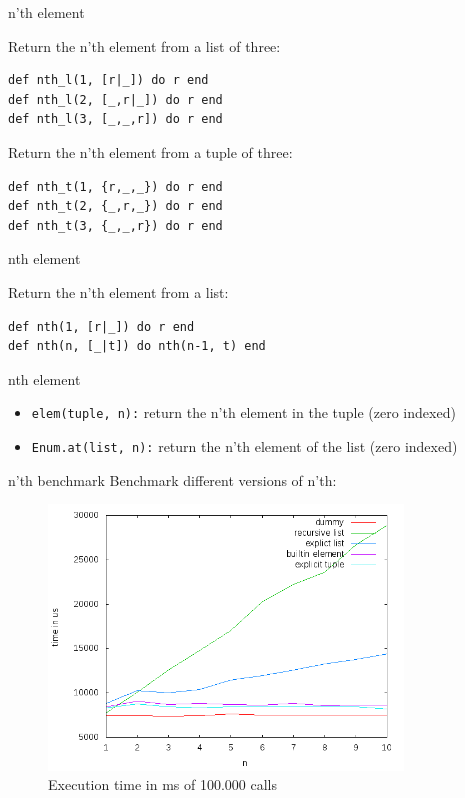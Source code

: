 \begin{frame}[fragile]{n'th element}

Return the n'th element from a list of three:

\pause 
\begin{verbatim}
def nth_l(1, [r|_]) do r end
def nth_l(2, [_,r|_]) do r end
def nth_l(3, [_,_,r]) do r end
\end{verbatim}

\pause Return the n'th element from a tuple of three:
\pause

\begin{verbatim}
def nth_t(1, {r,_,_}) do r end
def nth_t(2, {_,r,_}) do r end
def nth_t(3, {_,_,r}) do r end
\end{verbatim}

\end{frame}

\begin{frame}[fragile]{nth element}

Return the n'th element from a list:

\pause 
\begin{verbatim}
def nth(1, [r|_]) do r end
def nth(n, [_|t]) do nth(n-1, t) end
\end{verbatim}

\end{frame}


\begin{frame}{nth element}

\begin{itemize}
  \item {\tt elem(tuple, n):} return the n'th element in the tuple (zero indexed)
  \item {\tt Enum.at(list, n):} return the n'th element of the list (zero indexed)
\end{itemize}

\end{frame}

\begin{frame}{n'th benchmark}
Benchmark different versions of n'th:
 \begin{figure}
  \centering
  \includegraphics[height=200pt]{nth.png}
  \caption{Execution time in ms of 100.000 calls}
 \end{figure}

\end{frame}

